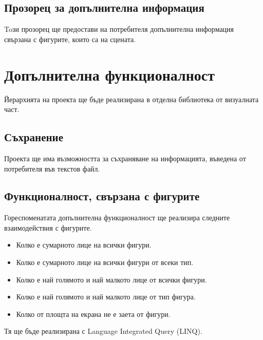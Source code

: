 \documentclass[a4paper,fleqn,12pt]{article}
\begin{document}
\subsection{Прозорец за допълнителна информация}
Toзи прозорец ще предостави на потребителя допълнителна информация свързана с фигурите, които са на сцената.  

\section{Допълнителна функционалност}
Йерархията на проекта ще бъде реализирана в отделна библиотека от визуалната част. 

\subsection{Съхранение}
Проекта ще има възможността за съхраняване на информацията, въведена от потребителя във текстов файл. 

\subsection{Функционалност, свързана с фигурите}
Гореспоменатата допълнителна функционалност ще реализира следните взаимодействия с фигурите.
\begin{itemize}
\item Колко е сумарното лице на всички фигури. 
\item Колко е сумарното лице на всички фигури от всеки тип.
\item Колко е най голямото и най малкото лице от всички фигури.
\item Колко е най голямото и най малкото лице от тип фигура.
\item Колко от площта на екрана не е заета от фигури. 
\end{itemize}
Тя ще бъде реализирана с Language Integrated Query (LINQ).
\end{document}
